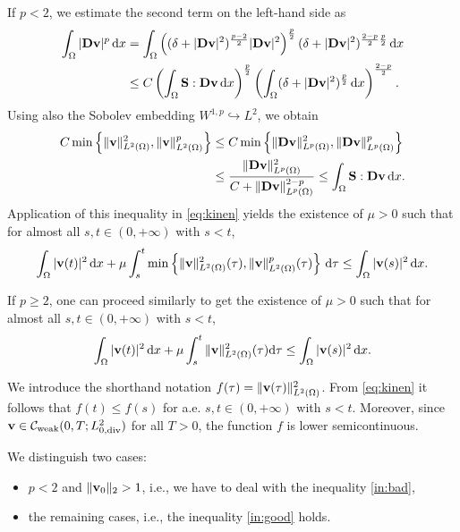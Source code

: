 \documentclass[11pt, a4paper, reqno]{amsart}
\numberwithin{equation}{section}
\newcommand{\diver}{\operatorname{div}}
\newcommand{\vc}[1]{{\bf #1}}
\newcommand{\vv}{\vc{v}}
\renewcommand{\S}{\mathbf{S}}
\newcommand{\D}{\mathbf{D}}
\newcommand{\dx}{\,{\rm d} {x}}
\newcommand{\intO}[1]{\int_{\Omega} #1 \dx}
\begin{document}
If $p<2$, we estimate the second term on the left-hand side as
\begin{equation}\begin{split}
\intO{|\D\vv|^p} &= \intO{\left((\delta+|\D\vv|^2)^{\frac{p-2}{2}}|\D\vv|^2\right)^{\frac{p}{2}} (\delta+|\D\vv|^2)^{\frac{2-p}{2} \frac{p}{2}}} \\
&\leq C\left(\intO{\S:\D\vv}\right)^{\frac{p}{2}} \left(\intO{(\delta+|\D\vv|^2)^{\frac{p}{2}}}\right)^{\frac{2-p}{2}}.
\end{split}\end{equation}
Using also the Sobolev embedding $W^{1,p}\hookrightarrow L^2$, we obtain
\begin{equation}\label{eq:sdv}\begin{split}
C\min\left\{ \|\vv\|_{L^2(\Omega)}^2, \|\vv\|_{L^2(\Omega)}^p\right\}
&\leq C\min\left\{ \|\D\vv\|_{L^p(\Omega)}^2, \|\D\vv\|_{L^p(\Omega)}^p\right\} \\
&\leq \frac{\|\D\vv\|_{L^p(\Omega)}^2}{C + \|\D\vv\|_{L^p(\Omega)}^{2-p}}
\leq \intO{\S:\D\vv}.
\end{split}\end{equation}
Application of this inequality in \eqref{eq:kinen} yields the existence of $\mu>0$ such that for almost all $s,t\in(0,+\infty)$ with $s<t$,
\begin{equation}\label{in:bad}
\intO{|\vv(t)|^2} + \mu\int_s^t\min\left\{ \|\vv\|_{L^2(\Omega)}^2(\tau), \|\vv\|_{L^2(\Omega)}^p(\tau)\right\}\, \mathrm{d}\tau
\leq \intO{|\vv(s)|^2}.
\end{equation}

If $p\geq 2$, one can proceed similarly to get the existence of $\mu>0$ such that for almost all $s,t\in(0,+\infty)$ with $s<t$,
\begin{equation}\label{in:good}
\intO{|\vv(t)|^2} + \mu\int_s^t\|\vv\|_{L^2(\Omega)}^2(\tau) \mathrm{d}\tau
\leq \intO{|\vv(s)|^2}.
\end{equation}

We introduce the shorthand notation $f(\tau)=\|\vv(\tau)\|_{L^2(\Omega)}^2$. From \eqref{eq:kinen} it follows that $f(t)\leq f(s)$ for a.e. $s,t\in(0,+\infty)$ with $s<t$. Moreover, since $\vv \in \mathcal{C}_{\textrm{weak}}(0,T; L^2_{0,\diver})$ for all $T>0$, the function $f$ is lower semicontinuous.

We distinguish two cases: 
\begin{itemize}
\item[a)] $p<2$ and $\|\vv_0\|_2>1$, i.e., we have to deal with the inequality \eqref{in:bad},
\item[b)] the remaining cases, i.e., the inequality \eqref{in:good} holds.
\end{itemize}
\end{document}
